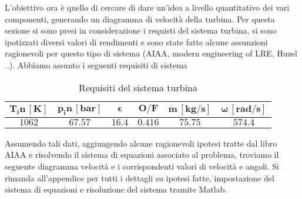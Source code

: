 L'obiettivo ora è quello di cercare di dare un'idea a livello quantitativo dei vari componenti, generando un diagramma di velocità della turbina. 
Per questa sezione si sono presi in considerazione i requisti del sistema turbina, si sono ipotizzati diversi valori di rendimenti e sono state fatte alcune assunzioni ragionevoli per questo tipo di sistema (AIAA, modern engineering of LRE, Huzel ..). Abbiamo assunto i seguenti requisiti di sistema

\begin{table}[H]

\centering
\begin{tabular}{|c|c|c|c|c|c|}
\hline
$\bm{T_in \, [K]}$ & $\bm{p_in \, [bar]}$ & $\bm{\epsilon}$ &  $\bm{O/F}$ & $\bm{\dot{m} \, [kg/s]}$ & $\bm{\omega \, [rad/s]}$  \\
\hline
$1062$ & $67.57$ & $16.4$ &  $0.416$ & $75.75$ & $574.4$ \\
\hline
\end{tabular}

\caption{Requisiti del sistema turbina}
\label{table:turbine specs}

\end{table}

Assumendo tali dati, aggiungendo alcune ragionevoli ipotesi tratte dal libro AIAA e risolvendo il sistema di equazioni associato al problema, troviamo il seguente diagramma velocità e i corrispondenti valori di velocità e angoli. Si rimanda all'appendice per tutti i dettagli su ipotesi fatte, impostazione del sistema di equazioni e risoluzione del sistema tramite Matlab. 



